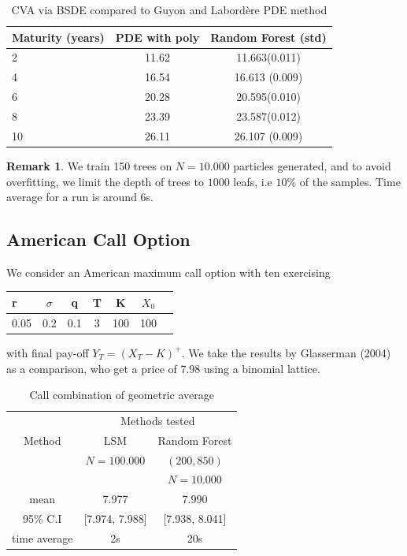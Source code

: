 \documentclass[english,11pt,openany]{report}
\theoremstyle{definition}
\theoremstyle{plain}
\theoremstyle{definition}
\newtheorem{Rem}[Th]{Remark}
\begin{document}
\begin{table}[H]
	\centering
	\caption{CVA via BSDE compared to Guyon and Labordère PDE method}\label{table:CVA}
		\begin{tabular}{|l|c|c|}\hline
			Maturity (years) & PDE with poly & Random Forest (std) \\ \hline
			2      &  11.62 &   11.663(0.011)   \\ \hline
			4     &  16.54 &    16.613 (0.009)    \\ \hline
			6   & 20.28  &   20.595(0.010)   \\  \hline
			8  &  23.39 &   23.587(0.012)  \\  \hline
			10  &  26.11 &   26.107 (0.009)   \\  \hline
	\end{tabular}
\end{table}

\begin{Rem}
	We train 150 trees on $N = 10.000$ particles generated, and to avoid overfitting, we limit the depth of trees to $1000$ leafs, i.e $10\%$ of the samples. Time average for a run is around 6s. 
\end{Rem}


\subsection{American Call Option}

We consider an American maximum call option with ten exercising 

\begin{table}[H]
	\centering
	\begin{tabular}{ |l|c|c|c|c|c|c|}\hline
		r & $\sigma$ & q & T  & K   & $X_0$    \\ \hline
		0.05   & 0.2  & 0.1 & 3 & 100 & 100      \\ \hline
		
	\end{tabular}
\end{table}

with final pay-off $Y_T = \left(X_T -K\right)^+$. 
We take the results by Glasserman (2004) \cite{glasserman:amoption} as a comparison, who get a price of 7.98 using a binomial lattice. 

\begin{table}[H]
	\centering
	\caption{Call combination of geometric average }\label{table:am_option}
	\begin{tabular}{*3c}
		\toprule
		& \multicolumn{2}{c}{Methods tested} \\
		\cmidrule(lr){2-3}
		Method  & LSM & Random Forest \\    
		& $N = 100.000$ & $(200, 850)$    \\
		 &  & $N = 10.000$    \\
		\midrule
		mean & 7.977  &   7.990     \\ 
		95\% C.I & [7.974, 7.988] &  [7.938, 8.041]     \\
		time average &   2s     &  20s
		\\
		\bottomrule
	\end{tabular}
\end{table}
\end{document}
